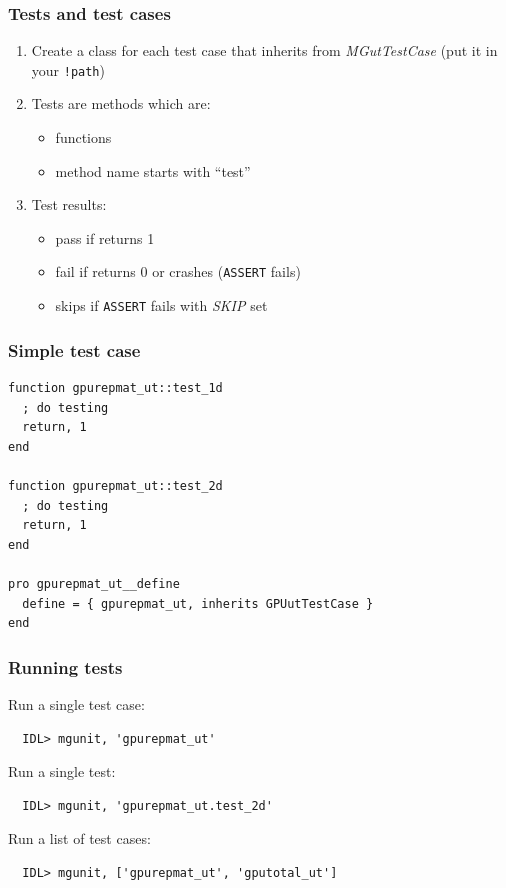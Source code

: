 \documentclass[12pt, handout]{beamer}
\begin{document}
\begin{frame}[t, fragile]
  \frametitle{Tests and test cases}
  \begin{enumerate}
    \item Create a class for each test case that inherits from {\em MGutTestCase} (put it in your {\tt !path})
    \item Tests are methods which are:
      \begin{itemize} 
        \item functions
        \item method name starts with ``test''
      \end{itemize}
    \item Test results:
      \begin{itemize}
        \item pass if returns 1
        \item fail if returns 0 or crashes ({\tt ASSERT} fails)
        \item skips if {\tt ASSERT} fails with {\em SKIP} set
      \end{itemize}
  \end{enumerate}
\end{frame}

\begin{frame}[t, fragile]
  \frametitle{Simple test case}

\begin{lstlisting}[basicstyle=\ttfamily\fontsize{10pt}{10pt}\selectfont]
function gpurepmat_ut::test_1d
  ; do testing
  return, 1
end

function gpurepmat_ut::test_2d
  ; do testing
  return, 1
end

pro gpurepmat_ut__define
  define = { gpurepmat_ut, inherits GPUutTestCase }
end
\end{lstlisting}

\end{frame}


\begin{frame}[t, fragile]
  \frametitle{Running tests}

Run a single test case:
\begin{lstlisting}
  IDL> mgunit, 'gpurepmat_ut'
\end{lstlisting}
Run a single test:
\begin{lstlisting}
  IDL> mgunit, 'gpurepmat_ut.test_2d'
\end{lstlisting}
Run a list of test cases:
\begin{lstlisting}
  IDL> mgunit, ['gpurepmat_ut', 'gputotal_ut']
\end{lstlisting}

\end{frame}
\end{document}
